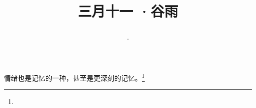 \title{\date[d=19,m=4,y=2024][year:cn-y,年,month:cn,day:cn,日,·,weekday]·三月十一 ·谷雨}
情绪也是记忆的一种，甚至是更深刻的记忆。\footnote{ }

